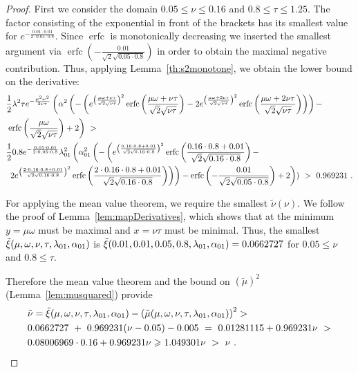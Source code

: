 \documentclass{article}
\newcommand\munn{{\tilde \mu}}
\newcommand\nunn{{\tilde \nu}}
\newcommand\xinn{{\tilde \xi}}
\renewcommand{\leq}{\leqslant}
\renewcommand{\geq}{\geqslant}
\DeclareMathOperator{\erfc}{erfc}
\begin{document}
\begin{proof}
First we consider the domain 
$0.05 \leq \nu \leq 0.16$  and $0.8 \leq \tau \leq 1.25$.
The factor consisting of the exponential in front of the brackets has
its smallest value for $e^{-\frac{0.01 \cdot 0.01}{2 \cdot 0.05 \cdot 0.8}}$.
Since $\erfc $ is monotonically decreasing we inserted the
smallest argument via $\erfc \left(-\frac{0.01}{\sqrt{2}
\sqrt{0.05 \cdot 0.8}}\right)$ in order to obtain the maximal negative contribution.
Thus, applying Lemma~\ref{th:s2monotone}, we obtain the lower bound on the derivative:
\begin{align}
&\frac{1}{2} \lambda ^2  \tau e^{-\frac{\mu^2 \omega^2}{2  \nu \tau}} \left(\alpha ^2 \left(-\left(e^{\left(\frac{\mu \omega+\nu \tau}{\sqrt{2} \sqrt{\nu \tau}}\right)^2} \erfc \left(\frac{\mu \omega+\nu \tau}{\sqrt{2} \sqrt{\nu \tau}}\right)-2 e^{\left(\frac{\mu \omega+2  \nu \tau}{\sqrt{2} \sqrt{\nu \tau}}\right)^2} \erfc \left(\frac{\mu \omega+2  \nu \tau}{\sqrt{2} \sqrt{\nu \tau}}\right)\right)\right)- \right.\\\nonumber &\left.\erfc \left(\frac{\mu \omega}{\sqrt{2} \sqrt{\nu \tau}}\right)+2\right)\ > \\ \nonumber &
\frac{1}{2} 0.8 e^{-\frac{0.01 \cdot 0.01}{2 \cdot 0.05 \cdot 0.8}} \lambda_{\rm 01}^2 \left(\alpha_{\rm 01}^2 \left(-\left(e^{\left(\frac{0.16 \cdot 0.8+0.01}{\sqrt{2} \sqrt{0.16 \cdot 0.8}}\right)^2} \erfc \left(\frac{0.16 \cdot 0.8+0.01}{\sqrt{2} \sqrt{0.16 \cdot 0.8}}\right)-\right.\right.\right.\\\nonumber &\left.\left.\left.2 e^{\left(\frac{2 \cdot  0.16 \cdot 0.8+0.01}{\sqrt{2} \sqrt{0.16 \cdot 0.8}}\right)^2} \erfc \left(\frac{2 \cdot 0.16 \cdot 0.8+0.01}{\sqrt{2} \sqrt{0.16 \cdot 0.8}}\right)\right)\right)-\erfc \left(-\frac{0.01}{\sqrt{2} \sqrt{0.05 \cdot 0.8}}\right)+2\right))\ > \ 0.969231 \ .
\end{align}

For applying the mean value theorem, we require the smallest $\nunn (\nu)$.
We follow the proof of Lemma~\ref{lem:mapDerivatives}, which shows
that at the minimum $y=\mu \omega$ must be maximal 
and $x=\nu \tau$ must be minimal.
Thus, the smallest 
$\xinn(\mu,\omega,\nu,\tau,\lambda_{\rm 01},\alpha_{\rm 01})$
is 
$\xinn(0.01,0.01,0.05,0.8,\lambda_{\rm 01},\alpha_{\rm 01})=0.0662727$
for $0.05 \leq \nu$ and $0.8 \leq \tau$.



Therefore the mean value theorem and the bound on $(\munn)^2$ (Lemma~\ref{lem:musquared}) provide
\begin{align}
&\nunn = 
\xinn(\mu,\omega,\nu,\tau,\lambda_{\rm 01},\alpha_{\rm 01}) - \left(\munn(\mu,\omega,\nu,\tau,\lambda_{\rm 01},\alpha_{\rm 01})\right)^2 > \\ \nonumber
& 0.0662727 \ + \  0.969231 (\nu-0.05) - 0.005\ = \  0.01281115 + 0.969231 \nu \ > \\ \nonumber 
& 0.08006969  \cdot  0.16  + 0.969231
  \nu \geq 1.049301 \nu \ > \ \nu \ .
\end{align}



\end{proof}
\end{document}
